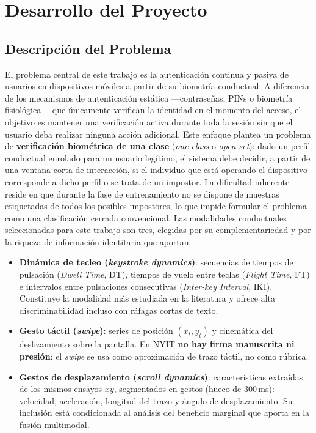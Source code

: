\chapter{Desarrollo del Proyecto}\label{chap:desarrollo}
\section{Descripción del Problema}

El problema central de este trabajo es la autenticación continua y pasiva de usuarios en dispositivos móviles 
a partir de su biometría conductual. A diferencia de los mecanismos de autenticación estática —contraseñas, 
PINs o biometría fisiológica— que únicamente verifican la identidad en el momento del acceso, el objetivo es 
mantener una verificación activa durante toda la sesión sin que el usuario deba realizar ninguna acción adicional.
Este enfoque plantea un problema de \textbf{verificación biométrica de una clase} (\textit{one-class} o \textit{open-set}): 
dado un perfil conductual enrolado para un usuario legítimo, el sistema debe decidir, a partir de una ventana 
corta de interacción, si el individuo que está operando el dispositivo corresponde a dicho perfil o se trata 
de un impostor. La dificultad inherente reside en que durante la fase de entrenamiento no se dispone de muestras 
etiquetadas de todos los posibles impostores, lo que impide formular el problema como una clasificación cerrada 
convencional.
Las modalidades conductuales seleccionadas para este trabajo son tres, elegidas por su complementariedad y por
la riqueza de información identitaria que aportan:

\begin{itemize}
    \item \textbf{Dinámica de tecleo (\textit{keystroke dynamics})}: secuencias de tiempos de pulsación (\textit{Dwell Time}, DT),
     tiempos de vuelo entre teclas (\textit{Flight Time}, FT) e intervalos entre pulsaciones consecutivas 
     (\textit{Inter-key Interval}, IKI). Constituye la modalidad más estudiada en la literatura y ofrece alta 
     discriminabilidad incluso con ráfagas cortas de texto.
    \item \textbf{Gesto táctil (\textit{swipe})}: series de posición $(x_t, y_t)$ y cinemática del deslizamiento
     sobre la pantalla. En NYIT \textbf{no hay firma manuscrita ni presión}: el \textit{swipe} se usa como
     aproximación de trazo táctil, no como rúbrica.
    \item \textbf{Gestos de desplazamiento (\textit{scroll dynamics})}: características extraídas de
     los mismos ensayos $xy$, segmentados en gestos (hueco de $300$\,ms): velocidad, aceleración, longitud del trazo
     y ángulo de desplazamiento. Su inclusión está condicionada al análisis del beneficio marginal que aporta en 
     la fusión multimodal.
\end{itemize}

